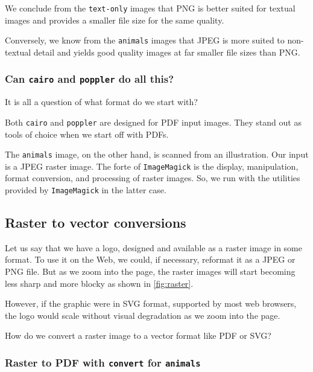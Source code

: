\documentclass[
  11pt,
  british,
  a4paper,
]{article}
\begin{document}
We conclude from the \texttt{text-only} images that PNG is better suited
for textual images and provides a smaller file size for the same
quality.

Conversely, we know from the \texttt{animals} images that JPEG is more
suited to non-textual detail and yields good quality images at far
smaller file sizes than PNG.

\hypertarget{can-cairo-and-poppler-do-all-this}{%
\subsubsection{\texorpdfstring{Can \texttt{cairo} and \texttt{poppler}
do all
this?}{Can cairo and poppler do all this?}}\label{can-cairo-and-poppler-do-all-this}}

It is all a question of what format do we start with?

Both \texttt{cairo} and \texttt{poppler} are designed for PDF input
images. They stand out as tools of choice when we start off with PDFs.

The \texttt{animals} image, on the other hand, is scanned from an
illustration. Our input is a JPEG raster image. The forte of
\texttt{ImageMagick} is the display, manipulation, format conversion,
and processing of raster images. So, we run with the utilities provided
by \texttt{ImageMagick} in the latter case.

\hypertarget{raster-to-vector-conversions}{%
\subsection{Raster to vector
conversions}\label{raster-to-vector-conversions}}

Let us say that we have a logo, designed and available as a raster image
in some format. To use it on the Web, we could, if necessary, reformat
it as a JPEG or PNG file. But as we zoom into the page, the raster
images will start becoming less sharp and more blocky as shown in
\cref{fig:raster}.

However, if the graphic were in SVG format, supported by most web
browsers, the logo would scale without visual degradation as we zoom
into the page.

How do we convert a raster image to a vector format like PDF or SVG?

\hypertarget{raster-to-pdf-with-convert-for-animals}{%
\subsubsection{\texorpdfstring{Raster to PDF with \texttt{convert} for
\texttt{animals}}{Raster to PDF with convert for animals}}\label{raster-to-pdf-with-convert-for-animals}}
\end{document}
